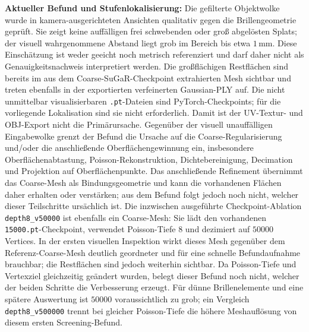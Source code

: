 \documentclass[12pt,a4paper]{article}
\begin{document}
\textbf{Aktueller Befund und Stufenlokalisierung:} Die gefilterte Objektwolke wurde in kamera-ausgerichteten Ansichten qualitativ gegen die Brillengeometrie geprüft. Sie zeigt keine auffälligen frei schwebenden oder groß abgelösten Splats; der visuell wahrgenommene Abstand liegt grob im Bereich bis etwa $1\,\mathrm{mm}$. Diese Einschätzung ist weder geeicht noch metrisch referenziert und darf daher nicht als Genauigkeitsnachweis interpretiert werden. Die großflächigen Restflächen sind bereits im aus dem Coarse-SuGaR-Checkpoint extrahierten Mesh sichtbar und treten ebenfalls in der exportierten verfeinerten Gaussian-PLY auf. Die nicht unmittelbar visualisierbaren \texttt{.pt}-Dateien sind PyTorch-Checkpoints; für die vorliegende Lokalisation sind sie nicht erforderlich. Damit ist der UV-Textur- und OBJ-Export nicht die Primärursache. Gegenüber der visuell unauffälligen Eingabewolke grenzt der Befund die Ursache auf die Coarse-Regularisierung und/oder die anschließende Oberflächengewinnung ein, insbesondere Oberflächenabtastung, Poisson-Rekonstruktion, Dichtebereinigung, Decimation und Projektion auf Oberflächenpunkte. Das anschließende Refinement übernimmt das Coarse-Mesh als Bindungsgeometrie und kann die vorhandenen Flächen daher erhalten oder verstärken; aus dem Befund folgt jedoch noch nicht, welcher dieser Teilschritte ursächlich ist. Die inzwischen ausgeführte Checkpoint-Ablation \texttt{depth8\_v50000} ist ebenfalls ein Coarse-Mesh: Sie lädt den vorhandenen \texttt{15000.pt}-Checkpoint, verwendet Poisson-Tiefe $8$ und dezimiert auf $50000$ Vertices. In der ersten visuellen Inspektion wirkt dieses Mesh gegenüber dem Referenz-Coarse-Mesh deutlich geordneter und für eine schnelle Befundaufnahme brauchbar; die Restflächen sind jedoch weiterhin sichtbar. Da Poisson-Tiefe und Vertexziel gleichzeitig geändert wurden, belegt dieser Befund noch nicht, welcher der beiden Schritte die Verbesserung erzeugt. Für dünne Brillenelemente und eine spätere Auswertung ist $50000$ voraussichtlich zu grob; ein Vergleich \texttt{depth8\_v500000} trennt bei gleicher Poisson-Tiefe die höhere Meshauflösung von diesem ersten Screening-Befund.
\end{document}
